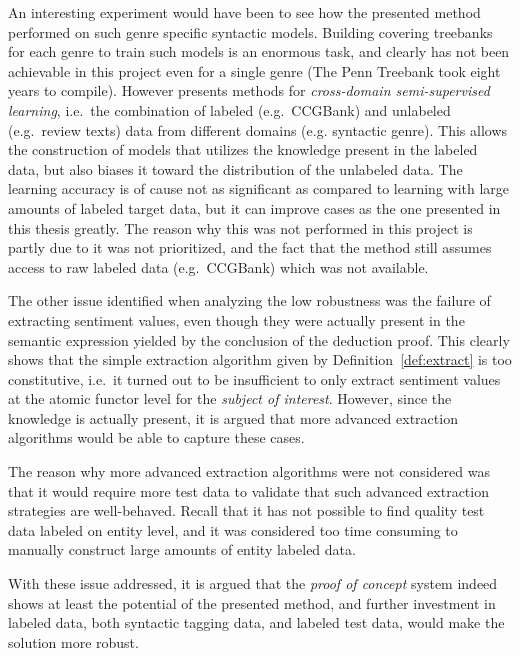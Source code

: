 An interesting experiment would have been to see how the presented method performed on such genre specific syntactic models.   Building covering treebanks for each genre to train such models is an enormous task, and clearly has not been achievable in this project even for a single genre (The Penn Treebank took eight years to compile). However \citeauthor{as}  presents methods for \emph{cross-domain semi-supervised learning}, i.e.\ the combination of labeled (e.g.\ CCGBank) and unlabeled (e.g.\ review texts) data from different domains (e.g. syntactic genre). This allows the construction of models that utilizes the knowledge present in the labeled data, but also biases it toward the distribution of the unlabeled data. The learning accuracy is of cause not as significant as compared to learning with large amounts of labeled target data, but it can improve cases as the one presented in this thesis greatly. The reason why this was not performed in this project is partly due to it was not prioritized, and the fact that the method still assumes access to raw labeled data (e.g.\ CCGBank) which was not available.

The other issue identified when analyzing the low robustness was the failure of extracting sentiment values, even though they were actually present in the semantic expression yielded by the conclusion of the deduction proof. This clearly shows that the simple extraction algorithm given by Definition~\ref{def:extract} is too constitutive, i.e.\ it turned out to be insufficient to only extract sentiment values at the atomic functor level for the \emph{subject of interest}. However, since the knowledge is actually present, it is argued that more advanced extraction algorithms would be able to capture these cases. 

The reason why more advanced extraction algorithms were not considered was that it would require more test data to validate that such advanced extraction strategies are well-behaved. %
Recall that it has not possible to find quality test data labeled on entity level, and it was considered  too time consuming to manually construct large amounts of entity labeled data.

With these issue addressed, it is argued that the \emph{proof of concept} system indeed shows at least the potential of the presented method, and further investment in labeled data, both syntactic tagging data, and labeled test data, would make the solution more robust.

